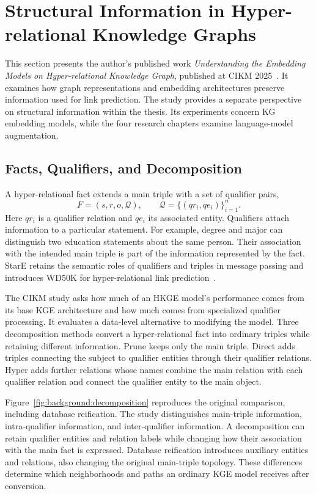 \section{Structural Information in Hyper-relational Knowledge Graphs}
\label{sec:background:hyperkg}

This section presents the author's published work \emph{Understanding the Embedding Models on Hyper-relational Knowledge Graph}, published at CIKM 2025~\cite{bg-hyperkg}. It examines how graph representations and embedding architectures preserve information used for link prediction. The study provides a separate perspective on structural information within the thesis. Its experiments concern KG embedding models, while the four research chapters examine language-model augmentation.

\subsection{Facts, Qualifiers, and Decomposition}

A hyper-relational fact extends a main triple with a set of qualifier pairs,
\begin{equation}
F=\left(s,r,o,\mathcal{Q}\right),\qquad
\mathcal{Q}=\{(qr_i,qe_i)\}_{i=1}^{n}.
\label{eq:background:hyper-fact}
\end{equation}
Here $qr_i$ is a qualifier relation and $qe_i$ its associated entity. Qualifiers attach information to a particular statement. For example, degree and major can distinguish two education statements about the same person. Their association with the intended main triple is part of the information represented by the fact. StarE retains the semantic roles of qualifiers and triples in message passing and introduces WD50K for hyper-relational link prediction~\cite{bg-stare}.

The CIKM study asks how much of an HKGE model's performance comes from its base KGE architecture and how much comes from specialized qualifier processing. It evaluates a data-level alternative to modifying the model. Three decomposition methods convert a hyper-relational fact into ordinary triples while retaining different information. Prune keeps only the main triple. Direct adds triples connecting the subject to qualifier entities through their qualifier relations. Hyper adds further relations whose names combine the main relation with each qualifier relation and connect the qualifier entity to the main object.

Figure~\ref{fig:background:decomposition} reproduces the original comparison, including database reification. The study distinguishes main-triple information, intra-qualifier information, and inter-qualifier information. A decomposition can retain qualifier entities and relation labels while changing how their association with the main fact is expressed. Database reification introduces auxiliary entities and relations, also changing the original main-triple topology. These differences determine which neighborhoods and paths an ordinary KGE model receives after conversion.

